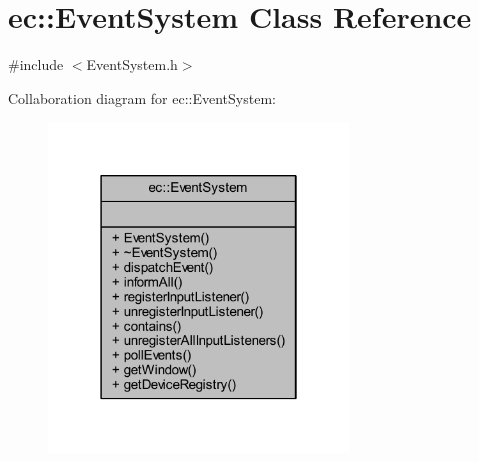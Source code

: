 \hypertarget{classec_1_1_event_system}{}\section{ec\+:\+:Event\+System Class Reference}
\label{classec_1_1_event_system}


{\ttfamily \#include $<$Event\+System.\+h$>$}



Collaboration diagram for ec\+:\+:Event\+System\+:\nopagebreak
\begin{figure}[H]
\begin{center}
\leavevmode
\includegraphics[width=226pt]{classec_1_1_event_system__coll__graph}
\end{center}
\end{figure}

